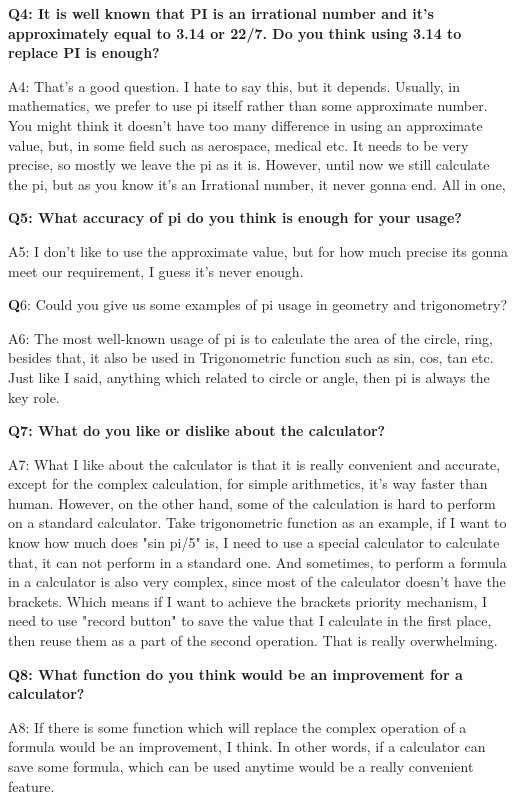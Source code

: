\documentclass[12pt,letterpaper]{article}
\begin{document}
\textbf {Q4: It is well known that PI is an irrational number and it’s approximately equal to 3.14 or 22/7. Do you think using 3.14 to replace PI is enough?}


A4: That's a good question.  I hate to say this, but it depends. Usually, in mathematics, we prefer to use pi itself rather than some approximate number. You might think it doesn't have too many difference in using an approximate value, but, in some field such as aerospace, medical etc. It needs to be very precise, so mostly we leave the pi as it is. However, until now we still calculate the pi, but as you know it's an Irrational number, it never gonna end. All in one,  

\textbf {Q5: What accuracy of pi do you think is enough for your usage?} 

A5: I don't like to use the approximate value, but for how much precise its gonna meet our requirement, I guess it's never enough.

\textbf Q6: Could you give us some examples of pi usage in geometry and trigonometry? 

A6: The most well-known usage of pi is to calculate the area of the circle, ring, besides that,  it also be used in Trigonometric function such as sin, cos, tan etc. Just like I said, anything which related to circle or angle, then pi is always the key role.

\textbf{Q7: What do you like or dislike about the calculator?}

A7: What I like about the calculator is that it is really convenient and accurate, except for the complex calculation, for simple arithmetics, it's way faster than human.  However, on the other hand, some of the calculation is hard to perform on a standard calculator. Take trigonometric function as an example, if I want to know how much does "sin pi/5" is, I need to use a special calculator to calculate that, it can not perform in a standard one. And sometimes, to perform a formula in a calculator is also very complex, since most of the calculator doesn't have the brackets. Which means if I want to achieve the brackets priority mechanism, I need to use "record button" to save the value that I calculate in the first place, then reuse them as a part of the second operation. That is really overwhelming.

\textbf{Q8: What function do you think would be an improvement for a calculator?}

A8: If there is some function which will replace the complex operation of a formula would be an improvement, I think. In other words,  if a calculator can save some formula, which can be used anytime would be a really convenient feature. 
\end{document}
